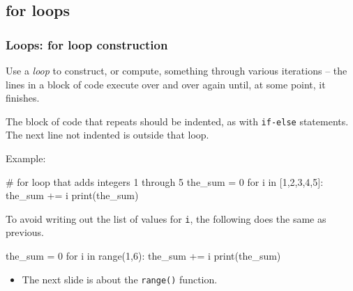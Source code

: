 \documentclass{beamer}
\newenvironment{codeblock}
    {\hfill\begin{beamerboxesrounded}[lower=codecol, width=0.8\textwidth]
    \medskip

    }
    { 
    \end{beamerboxesrounded}\hfill
    }
\theoremstyle{example}
\newcommand{\ttt}[1]{{\small\texttt{#1}}}
\begin{document}
\subsection{for loops}
\begin{frame}[fragile]
\frametitle{Loops: {\ttm for} loop construction}

Use a \emph{loop} to construct, or compute, something through various iterations {--} the lines in a block of code execute over and over again until, at some point, it finishes.

The block of code that repeats should be indented, as with \ttt{if-else} statements. The next line not indented is outside that loop.

\pause
Example:

\begin{codeblock}

\begin{python}
# for loop that adds integers 1 through 5
the_sum = 0
for i in [1,2,3,4,5]:
    the_sum += i
print(the_sum)
\end{python}

\end{codeblock}

\pause
To avoid writing out the list of values for \ttt{i}, the following does the same as previous.

\begin{codeblock}

\begin{python}
the_sum = 0
for i in range(1,6):
    the_sum += i
print(the_sum)
\end{python}
	
\end{codeblock}
\begin{itemize}
    \item[] The next slide is about the \ttt{range()} function.
\end{itemize}
\end{frame}
\end{document}
